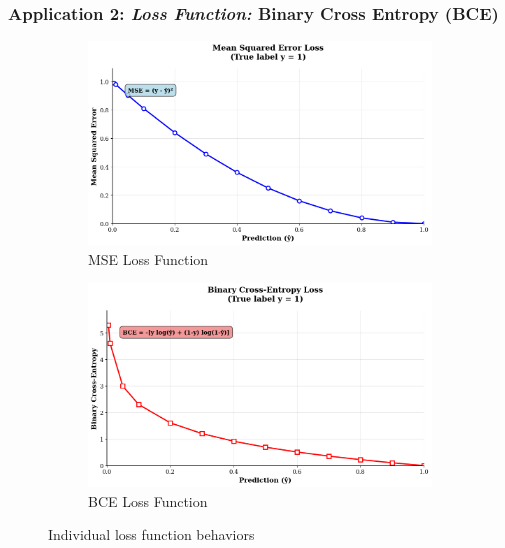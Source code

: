 \documentclass[12pt]{article}
\begin{document}
\subsubsection{Application 2: \textit{Loss Function:} Binary Cross Entropy (BCE)}

\begin{figure}[H]
    \centering
    \begin{subfigure}{0.49\textwidth}
        \includegraphics[width=\textwidth]{resources/MSE.png}
        \caption{MSE Loss Function}
        \label{fig:mse_plot}
    \end{subfigure}
    \hfill
    \begin{subfigure}{0.49\textwidth}
        \includegraphics[width=\textwidth]{resources/BCE.png}
        \caption{BCE Loss Function}
        \label{fig:bce_plot}
    \end{subfigure}
    \caption{Individual loss function behaviors}
    \label{fig:individual_loss}
\end{figure}
\end{document}
